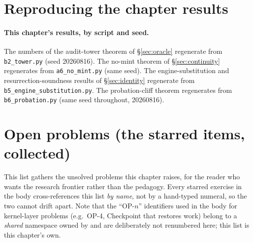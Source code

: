 \documentclass[11pt,a4paper]{article}
\theoremstyle{definition}
\begin{document}
\section{Reproducing the chapter results}\label{sec:history}

\begin{sloppypar}
\paragraph{This chapter's results, by script and seed.} The numbers of the
audit-tower theorem of \S\ref{sec:oracle} regenerate from
\texttt{b2\_tower.py} (seed 20260816). The no-mint theorem of
\S\ref{sec:continuity} regenerates from \texttt{a6\_no\_mint.py} (same seed).
The engine-substitution and resurrection-soundness results of
\S\ref{sec:identity} regenerate from
\texttt{b5\_engine\_substitution.py}. The probation-cliff theorem
regenerates from \texttt{b6\_probation.py} (same seed
throughout, 20260816).
\end{sloppypar}

\section{Open problems (the starred items, collected)}\label{sec:open}

This list gathers the unsolved problems this chapter raises, for the reader who
wants the research frontier rather than the pedagogy. Every starred exercise in the
body cross-references this list \emph{by name}, not by a hand-typed numeral, so the
two cannot drift apart. Note that the ``OP-$n$'' identifiers used in the body for
kernel-layer problems (e.g.\ OP-4, Checkpoint that restores work) belong to a \emph{shared}
namespace owned by  and are deliberately
not renumbered here; this list is
this chapter's own.
\end{document}
